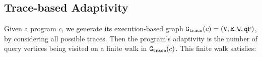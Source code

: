 %
\subsection{Trace-based Adaptivity}
Given a program $c$, we generate its execution-based graph 
$\mathtt{{G_{trace}}}({c}) = (\mathtt{V}, \mathtt{E}, \mathtt{W}, \mathtt{qF})$, by considering all possible traces.
%
Then the program's adaptivity is the number of query vertices being visited on a finite walk in $\mathtt{{G_{trace}}}({c})$. 
This finite walk satisfies:
%
